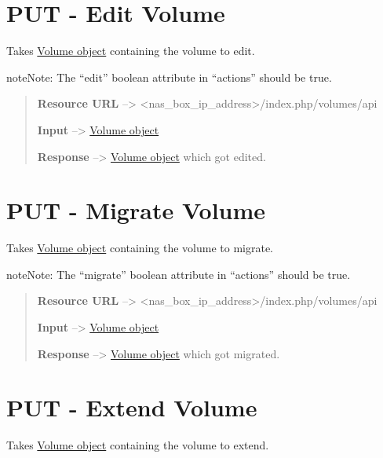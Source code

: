 \documentclass[letterpaper,10pt,english]{sphinxmanual}
\begin{document}
\section{PUT - Edit Volume}
\label{volumes:put-edit-volume}
Takes {\hyperref[volumes:volume-object-label]{Volume object}} containing the volume to edit.

\begin{notice}{note}{Note:}
The ``edit'' boolean attribute in ``actions'' should be true.
\end{notice}
\begin{quote}

\textbf{Resource URL} --\textgreater{} \textless{}nas\_box\_ip\_address\textgreater{}/index.php/volumes/api

\textbf{Input} --\textgreater{} {\hyperref[volumes:volume-object-label]{Volume object}}

\textbf{Response} --\textgreater{} {\hyperref[volumes:volume-object-label]{Volume object}} which got edited.
\end{quote}


\section{PUT - Migrate Volume}
\label{volumes:put-migrate-volume}
Takes {\hyperref[volumes:volume-object-label]{Volume object}} containing the volume to migrate.

\begin{notice}{note}{Note:}
The ``migrate'' boolean attribute in ``actions'' should be true.
\end{notice}
\begin{quote}

\textbf{Resource URL} --\textgreater{} \textless{}nas\_box\_ip\_address\textgreater{}/index.php/volumes/api

\textbf{Input} --\textgreater{} {\hyperref[volumes:volume-object-label]{Volume object}}

\textbf{Response} --\textgreater{} {\hyperref[volumes:volume-object-label]{Volume object}} which got migrated.
\end{quote}


\section{PUT - Extend Volume}
\label{volumes:put-extend-volume}
Takes {\hyperref[volumes:volume-object-label]{Volume object}} containing the volume to extend.
\end{document}
